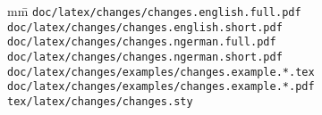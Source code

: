 \begin{tabbing}
	mm\=\kill
	\>\texttt{doc/latex/changes/changes.english.full.pdf}\\
	\>\texttt{doc/latex/changes/changes.english.short.pdf}\\
	\>\texttt{doc/latex/changes/changes.ngerman.full.pdf}\\
	\>\texttt{doc/latex/changes/changes.ngerman.short.pdf}\\

	\>\texttt{doc/latex/changes/examples/changes.example.*.tex}\\
	\>\texttt{doc/latex/changes/examples/changes.example.*.pdf}\\

	\>\texttt{tex/latex/changes/changes.sty}
\end{tabbing}

